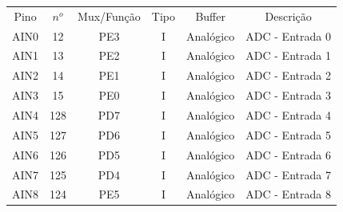 \begin{center}
\begin{longtable}{|c|c|c|c|c|c|}
	\rowcolor[HTML]{000000}
	{\color[HTML]{FFFFFF} Pino} & {\color[HTML]{FFFFFF} $n^{o}$} & {\color[HTML]{FFFFFF} Mux/Função} & {\color[HTML]{FFFFFF} Tipo} & {\color[HTML]{FFFFFF} Buffer} & {\color[HTML]{FFFFFF} Descrição}            \\
	AIN0                        & 12                             & PE3                               & I                           & Analógico                     & ADC - Entrada 0                             \\
	\hline
	AIN1                        & 13                             & PE2                               & I                           & Analógico                     & ADC - Entrada 1                             \\
	\hline
	AIN2                        & 14                             & PE1                               & I                           & Analógico                     & ADC - Entrada 2                             \\
	\hline
	AIN3                        & 15                             & PE0                               & I                           & Analógico                     & ADC - Entrada 3                             \\
	\hline
	AIN4                        & 128                            & PD7                               & I                           & Analógico                     & ADC - Entrada 4                             \\
	\hline
	AIN5                        & 127                            & PD6                               & I                           & Analógico                     & ADC - Entrada 5                             \\
	\hline
	AIN6                        & 126                            & PD5                               & I                           & Analógico                     & ADC - Entrada 6                             \\
	\hline
	AIN7                        & 125                            & PD4                               & I                           & Analógico                     & ADC - Entrada 7                             \\
	\hline
	AIN8                        & 124                            & PE5                               & I                           & Analógico                     & ADC - Entrada 8                             \\

\end{longtable}
\end{center}
